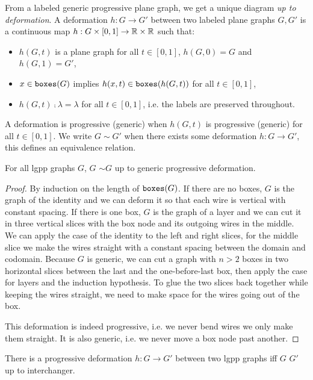 From a labeled generic progressive plane graph, we get a unique diagram \emph{up to deformation}.
A deformation $h : G \to G'$ between two labeled plane graphs $G, G'$ is a continuous map $h : G \times [0, 1] \to \mathbb{R} \times \mathbb{R}$ such that:
\begin{itemize}
\item $h(G, t)$ is a plane graph for all $t \in [0, 1]$, $h(G, 0) = G$ and $h(G, 1) = G'$,
\item $x \in \mathtt{boxes}(G)$ implies $h(x, t) \in \mathtt{boxes}(h(G, t))$ for all $t \in [0, 1]$,
\item $h(G, t) \fcmp \lambda = \lambda$ for all $t \in [0, 1]$, i.e. the labels are preserved throughout.
\end{itemize}
A deformation is progressive (generic) when $h(G, t)$ is progressive (generic) for all $t \in [0, 1]$.
We write $G \sim G'$ when there exists some deformation $h : G \to G'$, this defines an equivalence relation.

\begin{proposition}\label{proposition:g2d then d2g}
For all lgpp graphs $G$,  $G$ \py{))} $\sim G$ up to generic progressive deformation.
\end{proposition}

\begin{proof}
By induction on the length of $\mathtt{boxes}(G)$.
If there are no boxes, $G$ is the graph of the identity and we can deform it so that each wire is vertical with constant spacing.
If there is one box, $G$ is the graph of a layer and we can cut it in three vertical slices with the box node and its outgoing wires in the middle.
We can apply the case of the identity to the left and right slices, for the middle slice we make the wires straight with a constant spacing between the domain and codomain.
Because $G$ is generic, we can cut a graph with $n > 2$ boxes in two horizontal slices between the last and the one-before-last box, then apply the case for layers and the induction hypothesis.
To glue the two slices back together while keeping the wires straight, we need to make space for the wires going out of the box.

This deformation is indeed progressive, i.e. we never bend wires we only make them straight.
It is also generic, i.e. we never move a box node past another.
\end{proof}

\begin{proposition}\label{proposition:d2g then g2d}
There is a progressive deformation $h : G \to G'$ between two lgpp graphs iff  $G$  $G'$ \py{)} up to interchanger.
\end{proposition}

